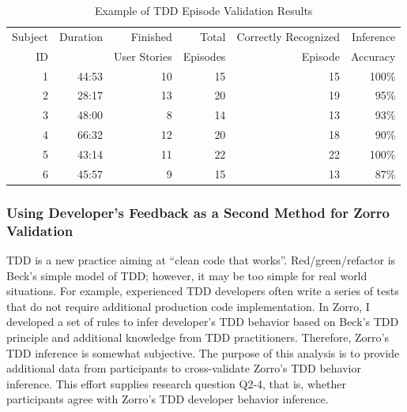 \begin{table}[htbp]
\centering
  \caption{Example of TDD Episode Validation Results}\label{tab:EpisodeValidationSummary}  
  \begin{tabular}{|r|r|r|r|r|r|}
  \hline
    Subject & Duration & Finished & Total & Correctly Recognized & Inference\\ 
    ID &  & User Stories & Episodes & Episode & Accuracy \\ \hline
    1 & 44:53 & 10 & 15 & 15 & 100\% \\ \hline
    2 & 28:17 & 13 & 20 & 19 & 95\% \\ \hline
    3 & 48:00 & 8 & 14 & 13 & 93\% \\ \hline
    4 & 66:32 & 12 & 20 & 18 & 90\% \\ \hline
    5 & 43:14 & 11 & 22 & 22 & 100\% \\ \hline
    6 & 45:57 &  9 & 15 & 13 & 87\% \\
  \hline
  \end{tabular}
\end{table}

\subsubsection{Using Developer's Feedback as a Second Method for Zorro Validation}
TDD is a new practice aiming at ``clean code that
works''. Red/green/refactor is Beck's simple model of TDD; however, it
may be too simple for real world situations. For example, experienced
TDD developers often write a series of tests that do not require
additional production code implementation. In Zorro, I developed a set
of rules to infer developer's TDD behavior based on Beck's TDD
principle and additional knowledge from TDD practitioners. Therefore,
Zorro's TDD inference is somewhat subjective.  The purpose of this
analysis is to provide additional data from participants to
cross-validate Zorro's TDD behavior inference. This effort supplies 
research question Q2-4, that is, whether participants agree with
Zorro's TDD developer behavior inference.

